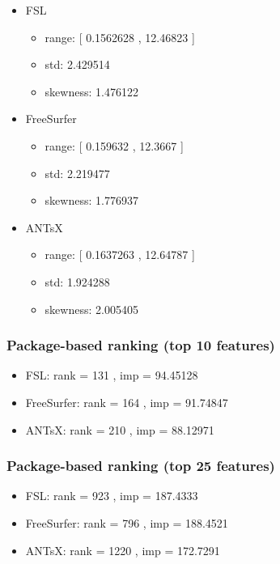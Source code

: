 \documentclass[
  10pt,
]{article}
\begin{document}
\begin{itemize}
\item
  FSL

  \begin{itemize}
  \item
    range: {[} 0.1562628 , 12.46823 {]}
  \item
    std: 2.429514
  \item
    skewness: 1.476122
  \end{itemize}
\item
  FreeSurfer

  \begin{itemize}
  \item
    range: {[} 0.159632 , 12.3667 {]}
  \item
    std: 2.219477
  \item
    skewness: 1.776937
  \end{itemize}
\item
  ANTsX

  \begin{itemize}
  \item
    range: {[} 0.1637263 , 12.64787 {]}
  \item
    std: 1.924288
  \item
    skewness: 2.005405
  \end{itemize}
\end{itemize}

\hypertarget{package-based-ranking-top-10-features-4}{%
\subsubsection{Package-based ranking (top 10
features)}\label{package-based-ranking-top-10-features-4}}

\begin{itemize}
\item
  FSL: rank = 131 , imp = 94.45128
\item
  FreeSurfer: rank = 164 , imp = 91.74847
\item
  ANTsX: rank = 210 , imp = 88.12971
\end{itemize}

\hypertarget{package-based-ranking-top-25-features-4}{%
\subsubsection{Package-based ranking (top 25
features)}\label{package-based-ranking-top-25-features-4}}

\begin{itemize}
\item
  FSL: rank = 923 , imp = 187.4333
\item
  FreeSurfer: rank = 796 , imp = 188.4521
\item
  ANTsX: rank = 1220 , imp = 172.7291
\end{itemize}
\end{document}

